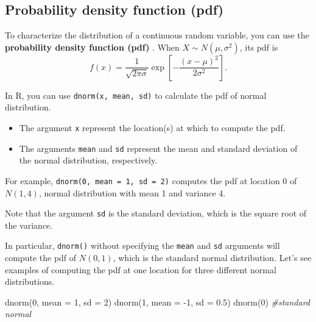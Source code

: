 \documentclass[
]{book}
\newenvironment{Shaded}{\begin{snugshade}}{\end{snugshade}}
\newcommand{\AttributeTok}[1]{\textcolor[rgb]{0.77,0.63,0.00}{#1}}
\newcommand{\CommentTok}[1]{\textcolor[rgb]{0.56,0.35,0.01}{\textit{#1}}}
\newcommand{\DecValTok}[1]{\textcolor[rgb]{0.00,0.00,0.81}{#1}}
\newcommand{\FloatTok}[1]{\textcolor[rgb]{0.00,0.00,0.81}{#1}}
\newcommand{\FunctionTok}[1]{\textcolor[rgb]{0.00,0.00,0.00}{#1}}
\newcommand{\NormalTok}[1]{#1}
\newcommand{\SpecialCharTok}[1]{\textcolor[rgb]{0.00,0.00,0.00}{#1}}
\newenvironment{blackbox}{
  \definecolor{shadecolor}{rgb}{0, 0, 0}  %
  \color{white}
  \begin{shaded}}
 {\end{shaded}}
\newenvironment{infobox}[1]
  {
  \begin{itemize}
  \renewcommand{\labelitemi}{
    \raisebox{-.7\height}[0pt][0pt]{
      {\setkeys{Gin}{width=3em,keepaspectratio}
        \texttt{[image: pics/\#1]}}
    }
  }
  \setlength{\fboxsep}{1em}
  \begin{blackbox}
  \item
  }
  {
  \end{blackbox}
  \end{itemize}
  }
\begin{document}
\hypertarget{pdf}{%
\subsection{Probability density function (pdf)}\label{pdf}}

To characterize the distribution of a continuous random variable, you can use the \textbf{probability density function (pdf)} . When \(X\sim N(\mu,\sigma^2)\), its pdf is
\[f(x) = \frac{1}{\sqrt{2\pi \sigma}}\exp\left[-\frac{(x-\mu)^2}{2\sigma^2}\right].\]

In R, you can use \texttt{dnorm(x,\ mean,\ sd)} to calculate the pdf of normal distribution.

\begin{itemize}
\item
  The argument \texttt{x} represent the location(s) at which to compute the pdf.
\item
  The arguments \texttt{mean} and \texttt{sd} represent the mean and standard deviation of the normal distribution, respectively.
\end{itemize}

For example, \texttt{dnorm(0,\ mean\ =\ 1,\ sd\ =\ 2)} computes the pdf at location 0 of \(N(1, 4)\), normal distribution with mean 1 and variance 4.

\begin{infobox}{caution}
Note that the argument \texttt{sd} is the standard deviation, which is the square root of the variance.

\end{infobox}

In particular, \texttt{dnorm()} without specifying the \texttt{mean} and \texttt{sd} arguments will compute the pdf of \(N(0,1)\), which is the standard normal distribution. Let's see examples of computing the pdf at one location for three different normal distributions.

\begin{Shaded}
\begin{Highlighting}[]
\FunctionTok{dnorm}\NormalTok{(}\DecValTok{0}\NormalTok{, }\AttributeTok{mean =} \DecValTok{1}\NormalTok{, }\AttributeTok{sd =} \DecValTok{2}\NormalTok{)}
\FunctionTok{dnorm}\NormalTok{(}\DecValTok{1}\NormalTok{, }\AttributeTok{mean =} \SpecialCharTok{{-}}\DecValTok{1}\NormalTok{, }\AttributeTok{sd =} \FloatTok{0.5}\NormalTok{)}
\FunctionTok{dnorm}\NormalTok{(}\DecValTok{0}\NormalTok{) }\CommentTok{\#standard normal}
\end{Highlighting}
\end{Shaded}
\end{document}

